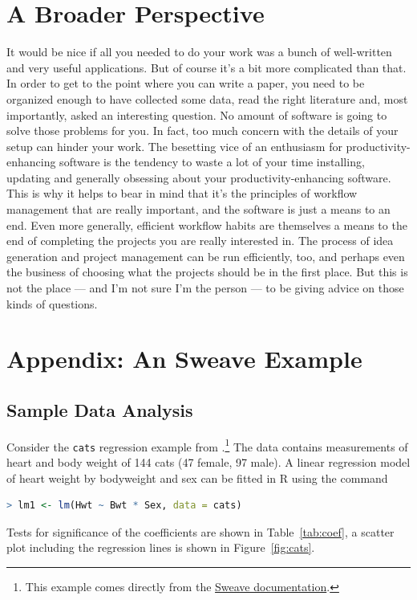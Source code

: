 \documentclass[11pt,article,oneside]{memoir}
\begin{document}
\section{A Broader Perspective} 
It would be nice if all you needed to do your work was a bunch of well-written and very useful applications. But of course it's a bit more complicated than that. In order to get to the point where you can write a paper, you need to be organized enough to have collected some data, read the right literature and, most importantly, asked an interesting question. No amount of software is going to solve those problems for you. In fact, too much concern with the details of your setup can hinder your work. The besetting vice of an enthusiasm for productivity-enhancing software is the tendency to waste a lot of your time installing, updating and generally obsessing about your productivity-enhancing software. This is why it helps to bear in mind that it's the principles of workflow management that are really important, and the software is just a means to an end. Even more generally, efficient workflow habits are themselves a means to the end of completing the projects you are really interested in. The process of idea generation and project management can be run efficiently, too, and perhaps even the business of choosing what the projects should be in the first place. But this is not the place --- and I'm not sure I'm the person --- to be giving advice on those kinds of questions.

\appendix

\section*{Appendix: An Sweave Example} %
\label{sec:an_sweave_example}
 
\subsection*{Sample Data Analysis} %
\label{sec:sample_data_analysis}
Consider the \texttt{cats} regression example from
\citet{venables02:_moder_applied_statis_s_plus}.\footnote{This example comes
  directly from the \href{http://www.ci.tuwien.ac.at/~leisch/Sweave/}{Sweave documentation}.} The data contains 
measurements of heart and body weight of 144 cats (47 female, 97 male). A
linear regression model of heart weight by bodyweight and sex can be fitted in
R using the command

\begin{lstlisting}[language=R,numbers=none]
> lm1 <- lm(Hwt ~ Bwt * Sex, data = cats)
\end{lstlisting}
\normalsize 
Tests for significance of the coefficients are shown in
Table~\ref{tab:coef}, a scatter plot including the regression lines is
shown in Figure~\ref{fig:cats}.
\end{document}
